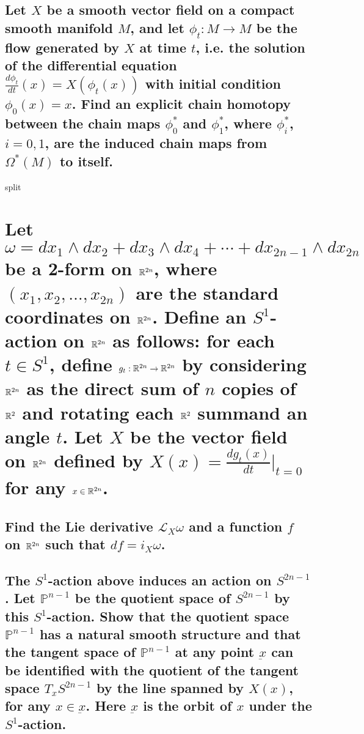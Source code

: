 \documentclass[10pt]{article}
\begin{document}
\subsection{Let $X$ be a smooth vector field on a compact smooth manifold $M$, and let $\phi_t: M
  \to M$ be the flow generated by $X$ at time $t$, i.e. the solution of the differential equation
  $\frac{d \phi_t}{dt}(x) = X(\phi_t(x))$ with initial condition $\phi_0(x) =x$. Find an explicit
  chain homotopy between the chain maps $\phi_0^*$ and $\phi_1^*$, where $\phi_i^*$, $i = 0,1$, are
  the induced chain maps from $\Omega^*(M)$ to itself. \\  }

split

\section{Let $\omega = dx_1 \wedge dx_2 + dx_3 \wedge dx_4 + \cdots + dx_{2n-1}\wedge dx_{2n}$ be a
  2-form on $\mathbb{R}^{2n}$, where $(x_1, x_2, \dots, x_{2n})$ are the standard coordinates on
  $\mathbb{R}^{2n}$. Define an $S^1$-action on $\mathbb{R}^{2n}$ as follows: for each $t \in S^1$, define $g_t :
  \mathbb{R}^{2n} \to \mathbb{R}^{2n}$ by considering $\mathbb{R}^{2n}$ as the direct sum of $n$ copies of $\mathbb{R}^2$ and
  rotating each $\mathbb{R}^2$ summand an angle $t$. Let $X$ be the vector field on $\mathbb{R}^{2n}$ defined by
  $X(x) = \frac{dg_t(x)}{dt} |_{t=0}$ for any $x \in \mathbb{R}^{2n}$. }
\subsection{Find the Lie derivative $\mathcal{L}_X \omega$ and a function $f$ on $\mathbb{R}^{2n}$ such that
  $df = i_X \omega$. }
\label{5a}
\subsection{The $S^1$-action above induces an action on $S^{2n-1}$. Let $\mathbb{P}^{n-1}$ be the
  quotient space of $S^{2n-1}$ by this $S^1$-action. Show that the quotient space $\mathbb{P}^{n-1}$
  has a natural smooth structure and that the tangent space of $\mathbb{P}^{n-1}$ at any point
  $\underbar{x}$ can be identified with the quotient of the tangent space $T_xS^{2n-1}$ by the line
  spanned by $X(x)$, for any $x \in \underbar{x}$. Here $\underbar{x}$ is the orbit of $x$ under the
  $S^1$-action.}
\label{5b}
\end{document}
